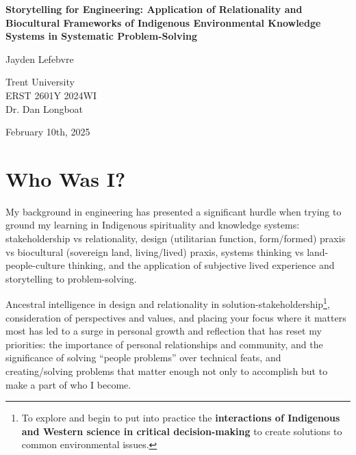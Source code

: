 \documentclass{report}
\begin{document}
\begin{titlepage}
    \begin{center}
        \vspace*{1.2cm}

        \textbf{Storytelling for Engineering: Application of Relationality and Biocultural Frameworks of Indigenous Environmental Knowledge Systems in Systematic Problem-Solving}

        \vspace{2cm}

        Jayden Lefebvre\\

        \vspace{5cm}
        
        Trent University\\
        ERST 2601Y 2024WI\\
        Dr. Dan Longboat\\

        \vfill

        February 10th, 2025
        
    \end{center}
\end{titlepage}

\clearpage

\section{Who Was I?}

My background in engineering has presented a significant hurdle when trying to ground my learning in Indigenous spirituality and knowledge systems: stakeholdership vs relationality, design (utilitarian function, form/formed) praxis vs biocultural (sovereign land, living/lived) praxis, systems thinking vs land-people-culture thinking, and the application of subjective lived experience and storytelling to problem-solving.

\hspace{24pt}Ancestral intelligence in design and relationality in solution-stakeholdership\footnote{To explore and begin to put into practice the \textbf{interactions of Indigenous and Western science in critical decision-making} to create solutions to common environmental issues.}, consideration of perspectives and values, and placing your focus where it matters most has led to a surge in personal growth and reflection that has reset my priorities: the importance of personal relationships and community, and the significance of solving ``people problems'' over technical feats, and creating/solving problems that matter enough not only to accomplish but to make a part of who I become.
\end{document}
